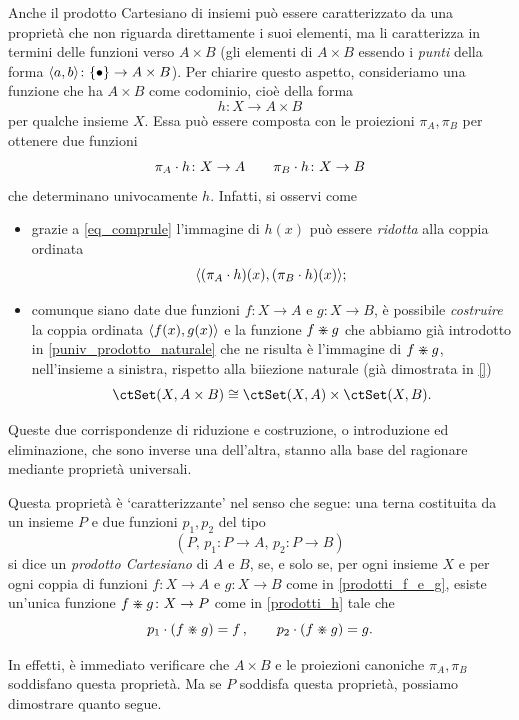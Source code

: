 Anche il prodotto Cartesiano di insiemi può essere caratterizzato da una proprietà che non riguarda direttamente i suoi elementi, ma li caratterizza in termini delle funzioni verso \(A\times B\) (gli elementi di \(A\times B\) essendo i \emph{punti} della forma \(\langle a,b\rangle \colon \{\bullet\} \to A\times B\)). Per chiarire questo aspetto, consideriamo una funzione che ha \(A\times B\) come codominio, cioè della forma
\[\label{prodotti_h}
 h\colon X\to A\times B
\]
per qualche insieme \(X\). Essa può essere composta con le proiezioni \(\pi_A,\pi_B\) per ottenere due funzioni
\[\label{prodotti_f_e_g}
 \pi_A\cdot h\colon X\to A \qquad \pi_B\cdot h\colon X\to B
\]
che determinano univocamente \(h\). Infatti, si osservi come
\begin{itemize}
 \item grazie a \ref{eq_comprule} l'immagine di \(h(x)\) può essere \emph{ridotta} alla coppia ordinata
       \[\langle (\pi_A\cdot h)(x),(\pi_B\cdot h)(x)\rangle;\]
 \item comunque siano date due funzioni \(f \colon X\to A\) e \(g \colon X \to B\), è possibile \emph{costruire} la coppia ordinata \(\langle f(x),g(x)\rangle\) e la funzione \(f\divideontimes g\) che abbiamo già introdotto in \ref{puniv_prodotto_naturale} che ne risulta è l'immagine di \(f\divideontimes g\), nell'insieme a sinistra, rispetto alla biiezione naturale (già dimostrata in \ref{})
       \[\Hom{\ctSet}(X,A\times B)\cong\Hom{\ctSet}(X,A)\times\Hom{\ctSet}(X,B).\]
\end{itemize}
Queste due corrispondenze di riduzione e costruzione, o introduzione ed eliminazione, che sono inverse una dell'altra, stanno alla base del ragionare mediante proprietà universali.
\begin{remark}\label{rmk_prodotto}
 Questa proprietà è `caratterizzante' nel senso che segue: una terna costituita da un insieme \(P\) e due funzioni \(p_1,p_2\) del tipo
 \[
  (P,\,  p_1\colon P\to A,\,  p_2\colon P\to B)
 \]
 si dice un \emph{prodotto Cartesiano} di \(A\) e \(B\), se, e solo se, per ogni insieme \(X\) e per ogni coppia di funzioni \(f \colon X \to A\) e \(g \colon X \to B\) come in \eqref{prodotti_f_e_g}, esiste un'unica funzione \(f\divideontimes g \colon X \to P\) come in \eqref{prodotti_h} tale che
 \[
  p_1\cdot (f\divideontimes g) = f\,,\qquad p_2\cdot (f\divideontimes g)=g.
 \]
\end{remark}
In effetti, è immediato verificare che \(A\times B\) e le proiezioni canoniche \(\pi_A,\pi_B\) soddisfano questa proprietà. Ma se \(P\) soddisfa questa proprietà, possiamo dimostrare quanto segue.
